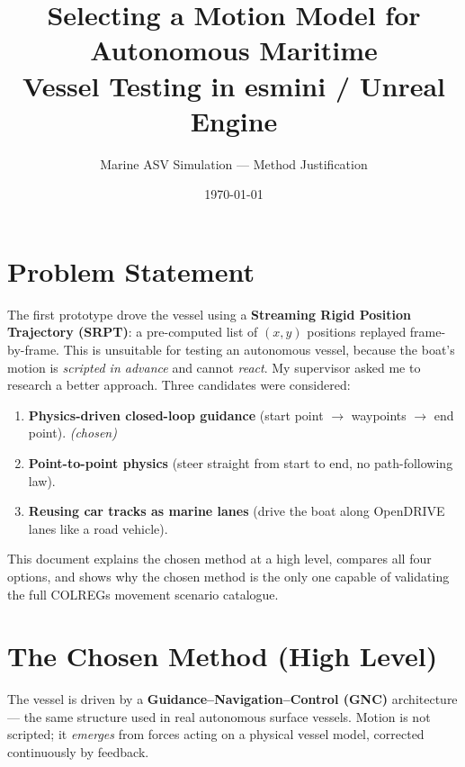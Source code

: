 \documentclass[11pt]{article}
\title{\vspace{-1.5em}\textbf{\color{navyblue} Selecting a Motion Model for Autonomous Maritime\\ Vessel Testing in esmini / Unreal Engine}}
\author{Marine ASV Simulation --- Method Justification}
\date{\today}
\begin{document}
\maketitle
\vspace{-1.5em}

\section{Problem Statement}
The first prototype drove the vessel using a \textbf{Streaming Rigid Position Trajectory (SRPT)}:
a pre-computed list of $(x,y)$ positions replayed frame-by-frame. This is unsuitable for testing
an autonomous vessel, because the boat's motion is \emph{scripted in advance} and cannot
\emph{react}. My supervisor asked me to research a better approach. Three candidates were
considered:

\begin{enumerate}[leftmargin=1.6em]
    \item \textbf{Physics-driven closed-loop guidance} (start point $\rightarrow$ waypoints $\rightarrow$ end point). \textit{(chosen)}
    \item \textbf{Point-to-point physics} (steer straight from start to end, no path-following law).
    \item \textbf{Reusing car tracks as marine lanes} (drive the boat along OpenDRIVE lanes like a road vehicle).
\end{enumerate}

This document explains the chosen method at a high level, compares all four options, and shows
why the chosen method is the only one capable of validating the full COLREGs movement scenario
catalogue.

\section{The Chosen Method (High Level)}
The vessel is driven by a \textbf{Guidance--Navigation--Control (GNC)} architecture --- the same
structure used in real autonomous surface vessels. Motion is not scripted; it \emph{emerges} from
forces acting on a physical vessel model, corrected continuously by feedback.
\end{document}

